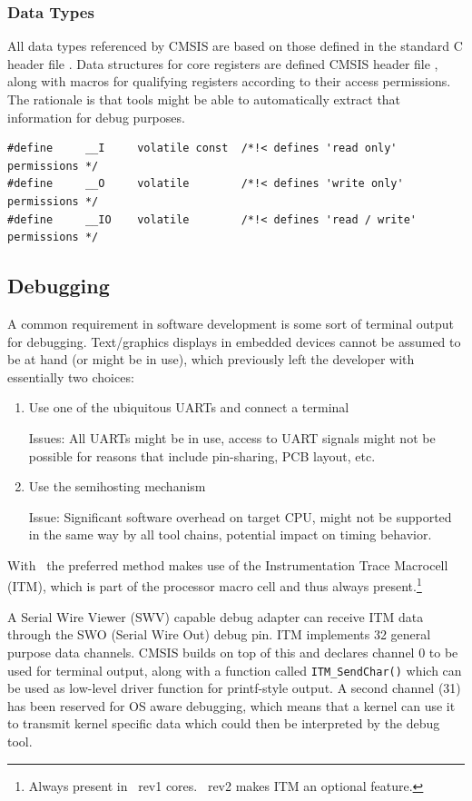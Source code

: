 \subsubsection{Data Types}

All data types referenced by CMSIS are based on those defined in the standard C
header file . Data structures for core registers are defined
CMSIS header file , along with macros for qualifying registers
according to their access permissions. The rationale is that tools might be able
to automatically extract that information for debug purposes.

\begin{lstlisting}[style=cpp]
#define 	__I 	volatile const	/*!< defines 'read only' permissions */
#define		__O 	volatile 		/*!< defines 'write only' permissions */
#define 	__IO 	volatile 		/*!< defines 'read / write' permissions */
\end{lstlisting}

\subsection{Debugging}

A common requirement in software development is some sort of terminal output for
debugging. Text/graphics displays in embedded devices cannot be assumed to be at
hand (or might be in use), which previously left the developer with essentially 
two choices:

\begin{enumerate}
\item Use one of the ubiquitous UARTs and connect a terminal

Issues: All UARTs might be in use, access to UART signals might not be possible
for reasons that include pin-sharing, PCB layout, etc.

\item Use the semihosting mechanism

Issue: Significant software overhead on target CPU, might not be supported in
the same way by all tool chains, potential impact on timing behavior.
\end{enumerate}

With \ the preferred method makes use of the Instrumentation Trace
Macrocell (ITM), which is part of the processor macro cell and thus always
present.\footnote{Always present in \ rev1 cores. \ rev2 makes
ITM an optional feature.}

A Serial Wire Viewer (SWV) capable debug adapter can receive ITM data through
the SWO (Serial Wire Out) debug pin. ITM implements 32 general purpose data
channels. CMSIS builds on top of this and declares channel 0 to be used for
terminal output, along with a function called \verb|ITM_SendChar()| which can be
used as low-level driver function for printf-style output. A second channel (31) 
has been reserved for OS aware debugging, which means that a kernel can use it
to transmit kernel specific data which could then be interpreted by the debug
tool. 

